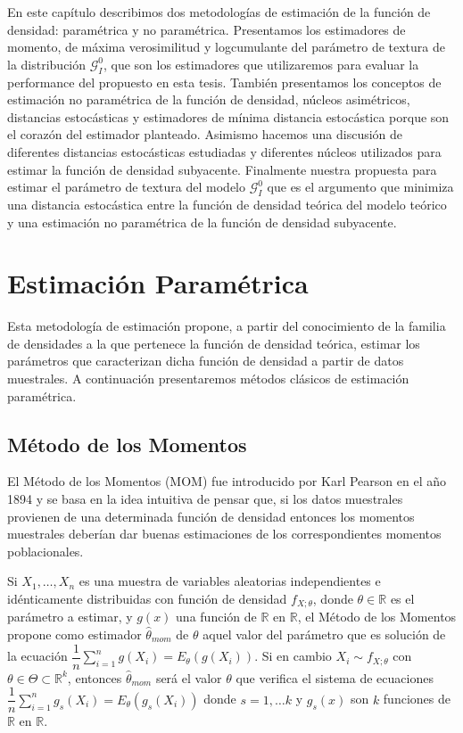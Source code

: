 En este capítulo describimos dos metodologías de estimación de la función de densidad: paramétrica y no paramétrica. Presentamos los estimadores de momento, de máxima verosimilitud y logcumulante del parámetro de textura de la distribución $\mathcal{G}_I^0$, que son los estimadores que utilizaremos para evaluar la performance del propuesto en esta tesis. También presentamos los conceptos de estimación no paramétrica de la función de densidad, núcleos asimétricos, distancias estocásticas y estimadores de mínima distancia estocástica porque son el corazón del estimador planteado.  Asimismo hacemos una discusión de diferentes distancias estocásticas estudiadas y diferentes núcleos utilizados para estimar la función de densidad subyacente. Finalmente nuestra propuesta para estimar el parámetro de textura del modelo $\mathcal{G}_I^0$ que es el argumento que minimiza una distancia estocástica entre la función de densidad teórica del modelo teórico y una estimación no paramétrica de la función de densidad subyacente. 


\section{Estimación Paramétrica}
\label{EstimacionParamétrica}

Esta metodología de estimación propone, a partir del conocimiento de la familia de densidades a la que pertenece la función de densidad teórica, estimar los parámetros que caracterizan dicha función de densidad a partir de datos muestrales. A continuación presentaremos métodos clásicos de estimación paramétrica.

\subsection{Método de los Momentos}
El Método de los Momentos (MOM) fue introducido por Karl Pearson en el año 1894 y se basa en la idea intuitiva de pensar que, si los datos muestrales provienen de una determinada función de densidad entonces los momentos muestrales deberían dar buenas estimaciones de los correspondientes momentos poblacionales. 

\begin{definition}
Si $X_1, \ldots, X_n$ es una muestra de variables aleatorias independientes e idénticamente distribuidas con función de densidad $f_{X;\theta}$, donde $\theta \in \mathbb{R}$ es el parámetro a estimar, y $g(x)$ una función de $\mathbb{R}$ en $\mathbb{R}$, el Método de los Momentos propone como estimador $\hat{\theta}_{mom}$ de $\theta$ aquel valor del parámetro que es solución de la ecuación  $\dfrac{1}{n} \sum_{i=1}^n g(X_i)=E_{\theta}(g(X_i)).$  
Si en cambio $X_i \sim f_{X;\theta}$ con $\theta \in \Theta \subset \mathbb{R}^k$, entonces $\hat{\theta}_{mom}$ será el valor $\theta$ que verifica el sistema de ecuaciones $\dfrac{1}{n} \sum_{i=1}^n g_s(X_i)=E_{\theta}(g_s(X_i))$ donde $s=1, \ldots k$ y $g_s(x)$ son $k$ funciones de $\mathbb{R}$ en $\mathbb{R}$.
\end{definition}


